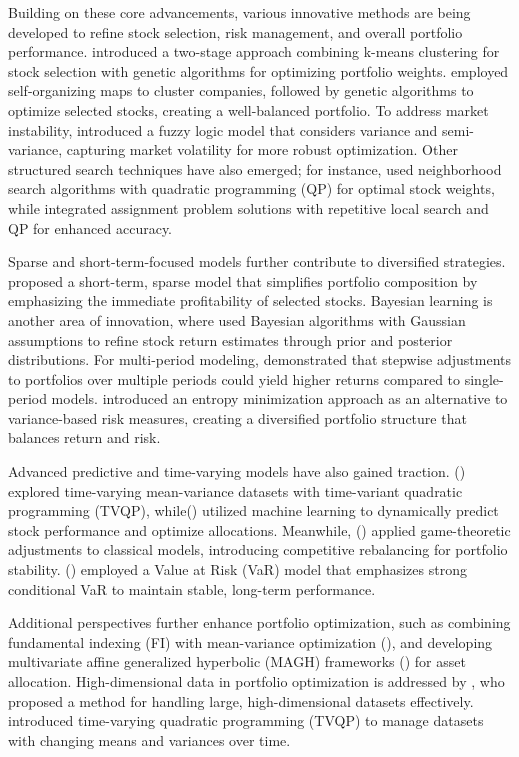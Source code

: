 \documentclass[preprint,12pt,authoryear]{elsarticle}
\begin{document}
Building on these core advancements, various innovative methods are being developed to refine stock selection, risk management, and overall portfolio performance. \cite{cheong2017using} introduced a two-stage approach combining k-means clustering for stock selection with genetic algorithms for optimizing portfolio weights. \cite{farid2022portfolio} employed self-organizing maps to cluster companies, followed by genetic algorithms to optimize selected stocks, creating a well-balanced portfolio. To address market instability, \cite{pahade2021multi} introduced a fuzzy logic model that considers variance and semi-variance, capturing market volatility for more robust optimization. Other structured search techniques have also emerged; for instance, \cite{akbay2020parallel} used neighborhood search algorithms with quadratic programming (QP) for optimal stock weights, while \cite{kizys2019biased} integrated assignment problem solutions with repetitive local search and QP for enhanced accuracy.

Sparse and short-term-focused models further contribute to diversified strategies. \cite{lai2018short} proposed a short-term, sparse model that simplifies portfolio composition by emphasizing the immediate profitability of selected stocks. Bayesian learning is another area of innovation, where \cite{de2019bayesian} used Bayesian algorithms with Gaussian assumptions to refine stock return estimates through prior and posterior distributions. For multi-period modeling,\cite{li2022multi} demonstrated that stepwise adjustments to portfolios over multiple periods could yield higher returns compared to single-period models. \cite{mercurio2020entropy} introduced an entropy minimization approach as an alternative to variance-based risk measures, creating a diversified portfolio structure that balances return and risk.

Advanced predictive and time-varying models have also gained traction. (\cite{katsikis2022time}) explored time-varying mean-variance datasets with time-variant quadratic programming (TVQP), while(\cite{kaczmarek2022building}) utilized machine learning to dynamically predict stock performance and optimize allocations. Meanwhile, (\cite{torrente2022rescaling}) applied game-theoretic adjustments to classical models, introducing competitive rebalancing for portfolio stability. (\cite{arcuri2023robust}) employed a Value at Risk (VaR) model that emphasizes strong conditional VaR to maintain stable, long-term performance.

Additional perspectives further enhance portfolio optimization, such as combining fundamental indexing (FI) with mean-variance optimization (\cite{pysarenko2019predictive}), and developing multivariate affine generalized hyperbolic (MAGH) frameworks (\cite{chaweewanchon2022markowitz}) for asset allocation. High-dimensional data in portfolio optimization is addressed by \cite{li2022spectrally}, who proposed a method for handling large, high-dimensional datasets effectively. \cite{katsikis2022time} introduced time-varying quadratic programming (TVQP) to manage datasets with changing means and variances over time.
\end{document}
